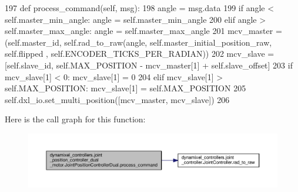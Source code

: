 \begin{DoxyCode}
197     \textcolor{keyword}{def }process\_command(self, msg):
198         angle = msg.data
199         \textcolor{keywordflow}{if} angle < self.master\_min\_angle: angle = self.master\_min\_angle
200         \textcolor{keywordflow}{elif} angle > self.master\_max\_angle: angle = self.master\_max\_angle
201         mcv\_master = (self.master\_id, self.rad\_to\_raw(angle, self.master\_initial\_position\_raw, self.flipped
      , self.ENCODER\_TICKS\_PER\_RADIAN))
202         mcv\_slave = [self.slave\_id, self.MAX\_POSITION - mcv\_master[1] + self.slave\_offset]
203         \textcolor{keywordflow}{if} mcv\_slave[1] < 0: mcv\_slave[1] = 0
204         \textcolor{keywordflow}{elif} mcv\_slave[1] > self.MAX\_POSITION: mcv\_slave[1] = self.MAX\_POSITION
205         self.dxl\_io.set\_multi\_position([mcv\_master, mcv\_slave])
206 \end{DoxyCode}
Here is the call graph for this function\+:
\nopagebreak
\begin{figure}[H]
\begin{center}
\leavevmode
\includegraphics[width=350pt]{d7/d04/classdynamixel__controllers_1_1joint__position__controller__dual__motor_1_1_joint_position_controller_dual_a039ec66c11ba0c6942ccc0b28b2fc3cf_cgraph}
\end{center}
\end{figure}
\mbox{\label{classdynamixel__controllers_1_1joint__position__controller__dual__motor_1_1_joint_position_controller_dual_a698acc04b07a10f5d79e694d632daa46}} 
